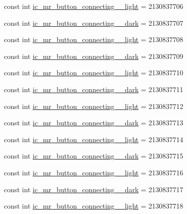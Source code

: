 \begin{CompactItemize}
\item 
const int \hyperlink{class__2doo_1_1_droid_1_1_resource_1_1_drawable_dfb5547df16d0f7a6ae93b8b14ac1889}{ic\_\-mr\_\-button\_\-connecting\_\_\-light} = 2130837706
\item 
const int \hyperlink{class__2doo_1_1_droid_1_1_resource_1_1_drawable_9cd92e560cce49c9985f877291abea1d}{ic\_\-mr\_\-button\_\-connecting\_\_\-dark} = 2130837707
\item 
const int \hyperlink{class__2doo_1_1_droid_1_1_resource_1_1_drawable_795b1b9fd025b5bc5e0fc9484dbdcde1}{ic\_\-mr\_\-button\_\-connecting\_\_\-light} = 2130837708
\item 
const int \hyperlink{class__2doo_1_1_droid_1_1_resource_1_1_drawable_29e563b1558ab6e5374102d3b20f99d8}{ic\_\-mr\_\-button\_\-connecting\_\_\-dark} = 2130837709
\item 
const int \hyperlink{class__2doo_1_1_droid_1_1_resource_1_1_drawable_e3dc051eb410eb93efa17e86904ec446}{ic\_\-mr\_\-button\_\-connecting\_\_\-light} = 2130837710
\item 
const int \hyperlink{class__2doo_1_1_droid_1_1_resource_1_1_drawable_54bb5d7e2a60cab9a4d79aec55a2455c}{ic\_\-mr\_\-button\_\-connecting\_\_\-dark} = 2130837711
\item 
const int \hyperlink{class__2doo_1_1_droid_1_1_resource_1_1_drawable_d9fa5dd23e609e0dced234f174fd2192}{ic\_\-mr\_\-button\_\-connecting\_\_\-light} = 2130837712
\item 
const int \hyperlink{class__2doo_1_1_droid_1_1_resource_1_1_drawable_01464a4e84212021b28ec587ea932869}{ic\_\-mr\_\-button\_\-connecting\_\_\-dark} = 2130837713
\item 
const int \hyperlink{class__2doo_1_1_droid_1_1_resource_1_1_drawable_ad88b22490dc59ebb4d76e888b8d3602}{ic\_\-mr\_\-button\_\-connecting\_\_\-light} = 2130837714
\item 
const int \hyperlink{class__2doo_1_1_droid_1_1_resource_1_1_drawable_332f6ad5fd955c378ebd684f6281ff84}{ic\_\-mr\_\-button\_\-connecting\_\_\-dark} = 2130837715
\item 
const int \hyperlink{class__2doo_1_1_droid_1_1_resource_1_1_drawable_05f61d49e74a978f756534a118b093a1}{ic\_\-mr\_\-button\_\-connecting\_\_\-light} = 2130837716
\item 
const int \hyperlink{class__2doo_1_1_droid_1_1_resource_1_1_drawable_4dfe8e68c2dac0f69682d9f35c7b9285}{ic\_\-mr\_\-button\_\-connecting\_\_\-dark} = 2130837717
\item 
const int \hyperlink{class__2doo_1_1_droid_1_1_resource_1_1_drawable_89cb632626922ae201fb025fe32a8cc5}{ic\_\-mr\_\-button\_\-connecting\_\_\-light} = 2130837718

\end{CompactItemize}
